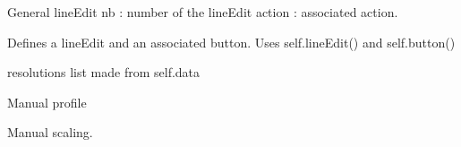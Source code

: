 \documentclass[letterpaper,10pt,openany,oneside]{sphinxmanual}
\begin{document}
\begin{fulllineitems}

\begin{fulllineitems}
\label{rst/visu2d:Visu.interface_actions.INTERACT.lineEdit}
General lineEdit
nb : number of the lineEdit
action : associated action.

\end{fulllineitems}


\begin{fulllineitems}
\label{rst/visu2d:Visu.interface_actions.INTERACT.lineEdit_and_button}
Defines a lineEdit and an associated button.
Uses self.lineEdit() and self.button()

\end{fulllineitems}


\begin{fulllineitems}
\label{rst/visu2d:Visu.interface_actions.INTERACT.list_res}
resolutions list made from self.data

\end{fulllineitems}


\begin{fulllineitems}
\label{rst/visu2d:Visu.interface_actions.INTERACT.manual_profile}
Manual profile

\end{fulllineitems}


\begin{fulllineitems}
\label{rst/visu2d:Visu.interface_actions.INTERACT.manual_scale}
Manual scaling.

\end{fulllineitems}



\end{fulllineitems}
\end{document}
